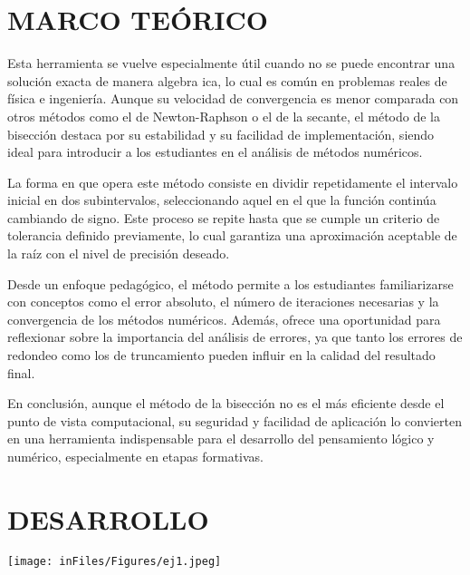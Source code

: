 \documentclass[12pt]{article}
\begin{document}
\vspace{0.5cm}

\section*{MARCO TEÓRICO}

{Esta herramienta se vuelve especialmente útil cuando no se puede encontrar una solución exacta de manera algebra
  ica, lo cual es común en problemas reales de física e ingeniería. Aunque su velocidad de convergencia es menor 
  comparada con otros métodos como el de Newton-Raphson o el de la secante, el método de la bisección destaca por su estabilidad 
  y su facilidad de implementación, siendo ideal para introducir a los estudiantes en el análisis de métodos numéricos.} \cite{chapra}

  {La forma en que opera este método consiste en dividir repetidamente el intervalo inicial en dos subintervalos, 
  seleccionando aquel en el que la función continúa cambiando de signo. Este proceso se repite hasta que se cumple un criterio 
  de tolerancia definido previamente, lo cual garantiza una aproximación aceptable de la raíz con el nivel de precisión deseado.} \cite{chapra}
 
   {Desde un enfoque pedagógico, el método permite a los estudiantes familiarizarse con conceptos como el error absoluto, 
   el número de iteraciones necesarias y la convergencia de los métodos numéricos. Además, ofrece una oportunidad para reflexionar
    sobre la importancia del análisis de errores, ya que tanto los errores de redondeo como los de truncamiento pueden influir en
     la calidad del resultado final.
   } \cite{mathews}

   {En conclusión, aunque el método de la bisección no es el más eficiente desde el punto de vista computacional, 
   su seguridad y facilidad de aplicación lo convierten en una herramienta indispensable para el desarrollo del pensamiento lógico
    y numérico, especialmente en etapas formativas.

   } \cite{fisicalabErrores}

\vspace{0.5cm}

\section*{DESARROLLO}
\begin{minipage}{0.95\textwidth}
    \raggedleft
    \texttt{[image: inFiles/Figures/ej1.jpeg]}
\end{minipage}
\end{document}
